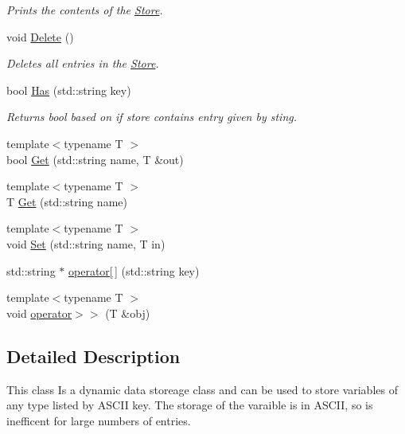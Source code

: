 \begin{DoxyCompactItemize}
\begin{DoxyCompactList}\small\item\em Prints the contents of the \hyperlink{classStore}{Store}. \end{DoxyCompactList}\item 
\hypertarget{classStore_a7fce0f8f3ec7978c5e7cd3d7053f899b}{void \hyperlink{classStore_a7fce0f8f3ec7978c5e7cd3d7053f899b}{Delete} ()}\label{classStore_a7fce0f8f3ec7978c5e7cd3d7053f899b}

\begin{DoxyCompactList}\small\item\em Deletes all entries in the \hyperlink{classStore}{Store}. \end{DoxyCompactList}\item 
bool \hyperlink{classStore_a41eaa81c4612fb5bdbf850afb6428977}{Has} (std\-::string key)
\begin{DoxyCompactList}\small\item\em Returns bool based on if store contains entry given by sting. \end{DoxyCompactList}\item 
{\footnotesize template$<$typename T $>$ }\\bool \hyperlink{classStore_abdc0134daa34b808328070f5d6b295f3}{Get} (std\-::string name, T \&out)
\item 
{\footnotesize template$<$typename T $>$ }\\T \hyperlink{classStore_a26d26db839f734e0af5404b7dac40dae}{Get} (std\-::string name)
\item 
{\footnotesize template$<$typename T $>$ }\\void \hyperlink{classStore_af586739813ce18da6f5e3561d134a814}{Set} (std\-::string name, T in)
\item 
std\-::string $\ast$ \hyperlink{classStore_a790ca02bc7d11648edf0c8d5df3751fe}{operator\mbox{[}$\,$\mbox{]}} (std\-::string key)
\item 
{\footnotesize template$<$typename T $>$ }\\void \hyperlink{classStore_abe9b65d1308c43dc4158b00d6aed7385}{operator$>$$>$} (T \&obj)
\end{DoxyCompactItemize}


\subsection{Detailed Description}
This class Is a dynamic data storeage class and can be used to store variables of any type listed by A\-S\-C\-I\-I key. The storage of the varaible is in A\-S\-C\-I\-I, so is inefficent for large numbers of entries.

